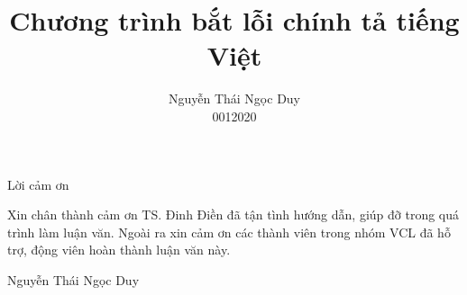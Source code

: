 \documentclass[a4paper,oneside,14pt]{extbook} %
\title{Chương trình bắt lỗi chính tả tiếng Việt}
\author{Nguyễn Thái Ngọc Duy\\0012020}
\begin{document}
\dominitoc
\maketitle

\begin{titlepage}
  \begin{center}
    \Large Lời cảm ơn
  \end{center}
  Xin chân thành cảm ơn TS. Đinh Điền đã tận tình hướng dẫn, giúp đỡ
  trong quá trình làm luận văn. Ngoài ra xin cảm ơn các thành viên
  trong nhóm VCL đã hỗ trợ, động viên hoàn thành luận văn này.
\vskip 1cm
\begin{flushright}
  Nguyễn Thái Ngọc Duy
\end{flushright}
\end{titlepage}

\tableofcontents






















\end{document}
